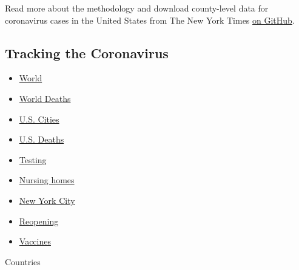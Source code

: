 Read more about the methodology and download county-level data for
coronavirus cases in the United States from The New York Times
\href{https://github.com/nytimes/covid-19-data}{on GitHub}.

\hypertarget{tracking-the-coronavirus}{%
\subsection{Tracking the Coronavirus}\label{tracking-the-coronavirus}}

\begin{itemize}
\tightlist
\item
  \href{https://www.nytimes3xbfgragh.onion/interactive/2020/world/coronavirus-maps.html}{World}
\item
  \href{https://www.nytimes3xbfgragh.onion/interactive/2020/04/21/world/coronavirus-missing-deaths.html}{World
  Deaths}
\item
  \href{https://www.nytimes3xbfgragh.onion/interactive/2020/04/23/upshot/five-ways-to-monitor-coronavirus-outbreak-us.html}{U.S.
  Cities}
\item
  \href{https://www.nytimes3xbfgragh.onion/interactive/2020/05/05/us/coronavirus-death-toll-us.html}{U.S.
  Deaths}
\item
  \href{https://www.nytimes3xbfgragh.onion/interactive/2020/us/coronavirus-testing.html}{Testing}
\item
  \href{https://www.nytimes3xbfgragh.onion/interactive/2020/us/coronavirus-nursing-homes.html}{Nursing
  homes}
\item
  \href{https://www.nytimes3xbfgragh.onion/interactive/2020/nyregion/new-york-city-coronavirus-cases.html}{New
  York City}
\item
  \href{https://www.nytimes3xbfgragh.onion/interactive/2020/us/states-reopen-map-coronavirus.html}{Reopening}
\item
  \href{https://www.nytimes3xbfgragh.onion/interactive/2020/science/coronavirus-vaccine-tracker.html}{Vaccines}
\end{itemize}

Countries

